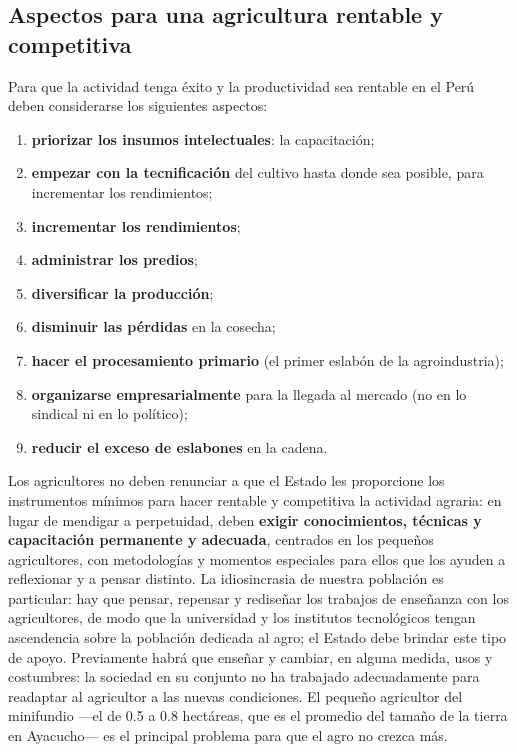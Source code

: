 \documentclass[
  man,
  floatsintext,
  longtable,
  a4paper,
  nolmodern,
  notxfonts,
  notimes,
  12pt,
  colorlinks=true,linkcolor=blue,citecolor=blue,urlcolor=blue]{apa7}
\providecommand{\tightlist}{%
  \setlength{\itemsep}{0pt}\setlength{\parskip}{0pt}}
\begin{document}
\subsection{Aspectos para una agricultura rentable y
competitiva}\label{aspectos-para-una-agricultura-rentable-y-competitiva}

Para que la actividad tenga éxito y la productividad sea rentable en el
Perú deben considerarse los siguientes aspectos:

\begin{enumerate}
\def\labelenumi{\arabic{enumi}.}
\tightlist
\item
  \textbf{priorizar los insumos intelectuales}: la capacitación;
\item
  \textbf{empezar con la tecnificación} del cultivo hasta donde sea
  posible, para incrementar los rendimientos;
\item
  \textbf{incrementar los rendimientos};
\item
  \textbf{administrar los predios};
\item
  \textbf{diversificar la producción};
\item
  \textbf{disminuir las pérdidas} en la cosecha;
\item
  \textbf{hacer el procesamiento primario} (el primer eslabón de la
  agroindustria);
\item
  \textbf{organizarse empresarialmente} para la llegada al mercado (no
  en lo sindical ni en lo político);
\item
  \textbf{reducir el exceso de eslabones} en la cadena.
\end{enumerate}

Los agricultores no deben renunciar a que el Estado les proporcione los
instrumentos mínimos para hacer rentable y competitiva la actividad
agraria: en lugar de mendigar a perpetuidad, deben \textbf{exigir
conocimientos, técnicas y capacitación permanente y adecuada}, centrados
en los pequeños agricultores, con metodologías y momentos especiales
para ellos que los ayuden a reflexionar y a pensar distinto. La
idiosincrasia de nuestra población es particular: hay que pensar,
repensar y rediseñar los trabajos de enseñanza con los agricultores, de
modo que la universidad y los institutos tecnológicos tengan ascendencia
sobre la población dedicada al agro; el Estado debe brindar este tipo de
apoyo. Previamente habrá que enseñar y cambiar, en alguna medida, usos y
costumbres: la sociedad en su conjunto no ha trabajado adecuadamente
para readaptar al agricultor a las nuevas condiciones. El pequeño
agricultor del minifundio ---el de 0.5 a 0.8 hectáreas, que es el
promedio del tamaño de la tierra en Ayacucho--- es el principal problema
para que el agro no crezca más.
\end{document}
